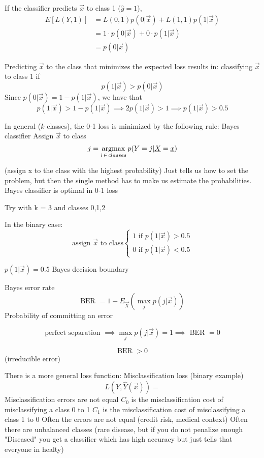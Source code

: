     If the classifier predicts $\vec{x}$ to class 1 ($\hat{y} = 1$),
    \begin{align*}
      E[L(Y,1)] & = L(0,1)p(0|\vec{x}) + L(1, 1)p(1|\vec{x}) \\
                & = 1 \cdot p(0|\vec{x}) + 0 \cdot p(1|\vec{x}) \\
                & = p(0|\vec{x})
    \end{align*}

    Predicting $\vec{x}$ to the class that minimizes the expected loss results in:
    classifying $\vec{x}$ to class 1 if $$p(1|\vec{x}) > p(0|\vec{x})$$
    Since $p(0|\vec{x}) = 1 - p(1|\vec{x})$, we have that
    $$p(1|\vec{x}) > 1 - p(1|\vec{x}) \implies 2p(1|\vec{x}) > 1 \implies p(1|\vec{x})>0.5$$ 

    In general ($k$ classes), the 0-1 loss is minimized by the following rule:
    Bayes classifier
    Assign $\vec{x}$ to class 
    $$j = \operatorname*{argmax}_{i\,\in\,classes} p(Y = j|\underline{X} = \underline{x})$$

    (assign x to the class with the highest probability)
    Just tells us how to set the problem, but then the single method has to make us estimate the probabilities.
    Bayes classifier is optimal in 0-1 loss

    Try with k = 3 and classes 0,1,2

    In the binary case:
    $$
    \text{assign } \vec{x} \text{ to class} 
    \begin{cases}
      1 \text{ if } p(1|\vec{x}) > 0.5\\
      0 \text{ if } p(1|\vec{x}) < 0.5
    \end{cases}
    $$
    
    $p(1|\vec{x}) = 0.5$ Bayes decision boundary

    Bayes error rate 
    $$\text{BER } = 1 - E_{\vec{X}}(\max_{j} p(j|\vec{x}))$$
    Probability of committing an error 

    $$\text{perfect separation } \implies \max_{j} p(j|\vec{x}) = 1 \implies \text{ BER } = 0$$

    $$\text{BER } > 0$$ (irreducible error)

    There is a more general loss function:
    Misclassification loss (binary example)
    $$L(Y, \hat{Y}(\vec{x})) = $$ %
    Misclassification errors are not equal 
    $C_0$ is the misclassification cost of misclassifying a class 0 to 1
    $C_1$ is the misclassification cost of misclassifying a class 1 to 0
    Often the errors are not equal (credit risk, medical context)
    Often there are unbalanced classes (rare disease, but if you do not penalize enough "Diseased" you get a classifier which has high accuracy but just tells that everyone in healty)

